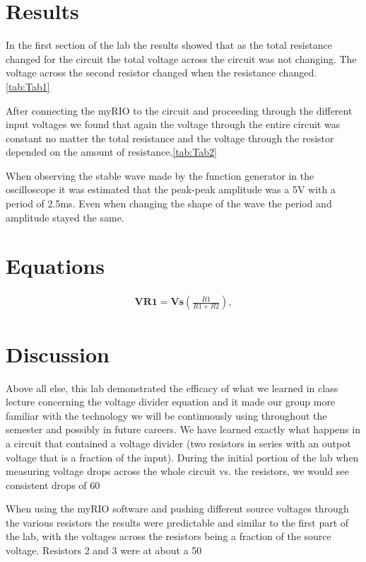 \documentclass[10pt,twocolumn]{article}
\begin{document}
\section{Results}

 In the first section of the lab the results showed that as the total resistance changed for the circuit the total voltage across the circuit was not changing. The voltage across the second resistor changed when the resistance changed. \autoref{tab:Tab1}
 
 	After connecting the myRIO to the circuit and proceeding through the different input voltages we found that again the voltage through the entire circuit was constant no matter the total resistance and the voltage through the resistor depended on the amount of resistance.\autoref{tab:Tab2}
 	
 	When observing the stable wave made by the function generator in the oscilloscope it was estimated that the peak-peak amplitude was a 5V with a period of 2.5ms. Even when changing the shape of the wave the period and amplitude stayed the same.  
 	  
\section{Equations}


\begin{align}
	\bm{VR1} = \bm{Vs} 
    	\left(
        	\frac{R1}{R1+R2}
        \right), 
\end{align}
\section{Discussion}
Above all else, this lab demonstrated the efficacy of what we learned in class lecture concerning the voltage divider equation and it made our group more familiar with the technology we will be continuously using throughout the semester and possibly in future careers. We have learned exactly what happens in a circuit that contained a voltage divider (two resistors in series with an outpot voltage that is a fraction of the input). During the initial portion of the lab when measuring voltage drops across the whole circuit vs. the resistors, we would see consistent drops of 60%

When using the myRIO software and pushing different source voltages through the various resistors the results were predictable and similar to the first part of the lab, with the voltages across the resistors being a fraction of the source voltage. Resistors 2 and 3 were at about a 50%
\end{document}
